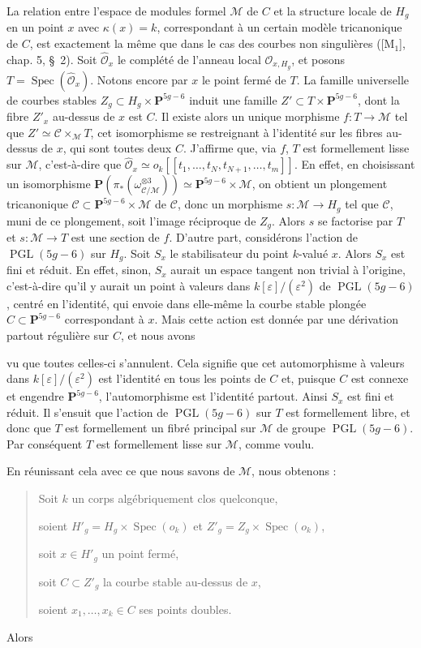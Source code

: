 \documentclass[10pt]{article}
\newcommand{\Spec}{\operatorname{Spec}}
\newcommand{\PGL}{\operatorname{PGL}}
\newcommand{\cO}{\mathcal O}
\newcommand{\cM}{\mathcal M}
\newcommand{\cC}{\mathcal C}
\newcommand{\PP}{\mathbf P}
\newcommand{\eps}{\varepsilon}
\begin{document}
La relation entre l'espace de modules formel $\cM$ de $C$ et la structure locale de $H_g$ en un point $x$ avec $\kappa(x)=k$, correspondant à un certain modèle tricanonique de $C$, est exactement la même que dans le cas des courbes non singulières ([M$_1$], chap. 5, \S~2). Soit $\widehat{\cO}_x$ le complété de l'anneau local $\cO_{x,H_g}$, et posons $T=\Spec(\widehat{\cO}_x)$. Notons encore par $x$ le point fermé de $T$. La famille universelle de courbes stables $Z_g\subset H_g\times\PP^{5g-6}$ induit une famille $Z'\subset T\times\PP^{5g-6}$, dont la fibre $Z'_x$ au-dessus de $x$ est $C$. Il existe alors un unique morphisme $f:T\to\cM$ tel que $Z'\simeq\cC\times_{\cM}T$, cet isomorphisme se restreignant à l'identité sur les fibres au-dessus de $x$, qui sont toutes deux $C$. J'affirme que, via $f$, $T$ est formellement lisse sur $\cM$, c'est-à-dire que $\widehat{\cO}_x\simeq o_k[[t_1,\ldots,t_N,t_{N+1},\ldots,t_m]]$. En effet, en choisissant un isomorphisme $\PP(\pi_*(\omega_{\cC/\cM}^{\otimes3}))\simeq\PP^{5g-6}\times\cM$, on obtient un plongement tricanonique $\cC\subset\PP^{5g-6}\times\cM$ de $\cC$, donc un morphisme $s:\cM\to H_g$ tel que $\cC$, muni de ce plongement, soit l'image réciproque de $Z_g$. Alors $s$ se factorise par $T$ et $s:\cM\to T$ est une section de $f$. D'autre part, considérons l'action de $\PGL(5g-6)$ sur $H_g$. Soit $S_x$ le stabilisateur du point $k$-valué $x$. Alors $S_x$ est fini et réduit. En effet, sinon, $S_x$ aurait un espace tangent non trivial à l'origine, c'est-à-dire qu'il y aurait un point à valeurs dans $k[\eps]/(\eps^2)$ de $\PGL(5g-6)$, centré en l'identité, qui envoie dans elle-même la courbe stable plongée $C\subset\PP^{5g-6}$ correspondant à $x$. Mais cette action est donnée par une dérivation partout régulière sur $C$, et nous avons


vu que toutes celles-ci s'annulent. Cela signifie que cet automorphisme à valeurs dans $k[\eps]/(\eps^2)$ est l'identité en tous les points de $C$ et, puisque $C$ est connexe et engendre $\PP^{5g-6}$, l'automorphisme est l'identité partout. Ainsi $S_x$ est fini et réduit. Il s'ensuit que l'action de $\PGL(5g-6)$ sur $T$ est formellement libre, et donc que $T$ est formellement un fibré principal sur $\cM$ de groupe $\PGL(5g-6)$. Par conséquent $T$ est formellement lisse sur $\cM$, comme voulu.

En réunissant cela avec ce que nous savons de $\cM$, nous obtenons :

\begin{quote}
Soit $k$ un corps algébriquement clos quelconque,\par
soient $H'_g=H_g\times\Spec(o_k)$ et $Z'_g=Z_g\times\Spec(o_k)$,\par
soit $x\in H'_g$ un point fermé,\par
soit $C\subset Z'_g$ la courbe stable au-dessus de $x$,\par
soient $x_1,\ldots,x_k\in C$ ses points doubles.
\end{quote}
Alors
\end{document}
